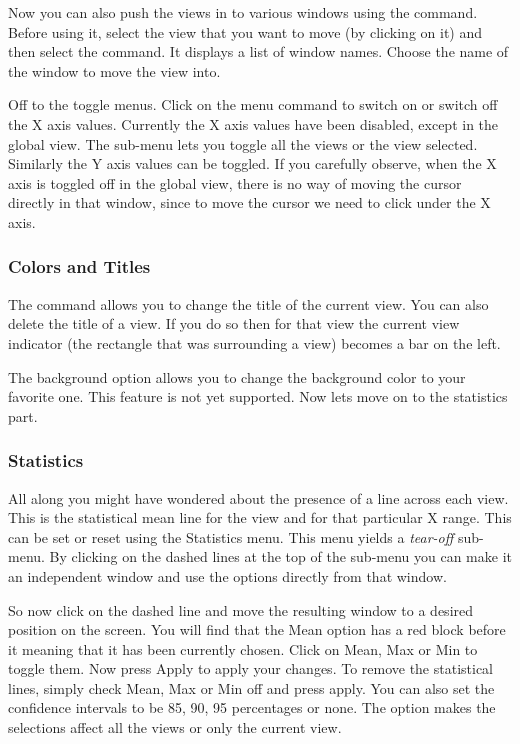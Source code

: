 Now you can also push the views in to various windows using the
 command. Before using it, select the view that
you want to move (by clicking on it) and then select the command. It
displays a list of window names. Choose the name of the window to move
the view into.

Off to the toggle menus. Click on the  menu
command to switch on or switch off the X axis values. Currently the X
axis values have been disabled, except in the global view. The
sub-menu  lets you toggle all the views
or the view selected. Similarly the Y axis values can be toggled. If
you carefully observe, when the X axis is toggled off in the global
view, there is no way of moving the cursor directly in that window,
since to move the cursor we need to click under the X axis.

\subsubsection{Colors and Titles}

The  command allows you to change the title of the current
view. You can also delete the title of a view. If you do so then for
that view the current view indicator (the rectangle that was
surrounding a view) becomes a bar on the left.

The background option allows you to change the background color to
your favorite one. This feature is not yet supported. Now lets move on
to the statistics part.

\subsubsection{Statistics}

All along you might have wondered about the presence of a line across
each view. This is the statistical mean line for the view and for that
particular X range. This can be set or reset using the Statistics
menu. This menu yields a {\em tear-off} sub-menu. By clicking on the
dashed lines at the top of the sub-menu you can make it an independent
window and use the options directly from that window.

So now click on the dashed line and move the resulting window to a
desired position on the screen. You will find that the Mean option has
a red block before it meaning that it has been currently chosen. Click
on Mean, Max or Min to toggle them. Now press Apply to apply your
changes. To remove the statistical lines, simply check Mean, Max or
Min off and press apply. You can also set the confidence intervals to
be 85, 90, 95 percentages or none. The 
option makes the selections affect all the views or only the current
view.

